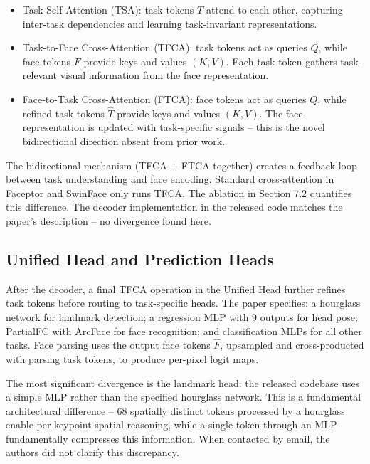 \documentclass[11pt]{article}
\begin{document}
\begin{itemize}\item Task Self-Attention (TSA): task tokens $T$ attend to each other, capturing inter-task dependencies and learning task-invariant representations.\end{itemize}

\begin{itemize}\item Task-to-Face Cross-Attention (TFCA): task tokens act as queries $Q$, while face tokens $F$ provide keys and values $(K,V)$. Each task token gathers task-relevant visual information from the face representation.\end{itemize}

\begin{itemize}\item Face-to-Task Cross-Attention (FTCA): face tokens act as queries $Q$, while refined task tokens $\hat{T}$ provide keys and values $(K,V)$. The face representation is updated with task-specific signals -- this is the novel bidirectional direction absent from prior work.\end{itemize}

The bidirectional mechanism (TFCA + FTCA together) creates a feedback loop between task understanding and face encoding. Standard cross-attention in Faceptor and SwinFace only runs TFCA. The ablation in Section 7.2 quantifies this difference. The decoder implementation in the released code matches the paper's description -- no divergence found here.



\subsection{Unified Head and Prediction Heads}

After the decoder, a final TFCA operation in the Unified Head further refines task tokens before routing to task-specific heads. The paper specifies: a hourglass network for landmark detection; a regression MLP with 9 outputs for head pose; PartialFC with ArcFace for face recognition; and classification MLPs for all other tasks. Face parsing uses the output face tokens $\hat{F}$, upsampled and cross-producted with parsing task tokens, to produce per-pixel logit maps.

The most significant divergence is the landmark head: the released codebase uses a simple MLP rather than the specified hourglass network. This is a fundamental architectural difference -- 68 spatially distinct tokens processed by a hourglass enable per-keypoint spatial reasoning, while a single token through an MLP fundamentally compresses this information. When contacted by email, the authors did not clarify this discrepancy.
\end{document}
